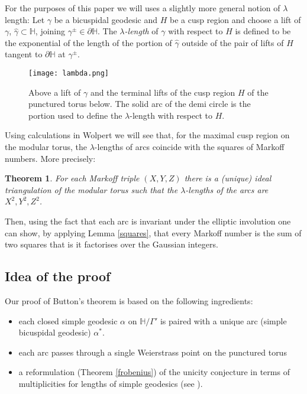\documentclass[12pt,a4paper]{amsart}
\newtheorem{thm}{Theorem}[section]
\def\HH{\mathbb{H}}
\def\xx{\HH/\Gamma'}
\begin{document}
For the purposes of this paper we will uses a slightly more general notion of
$\lambda$ length: Let $\gamma$ be a bicuspidal geodesic and $H$ be a cusp
region and choose a lift of  
$\gamma$, $\hat{\gamma}\subset \HH$,
joining $\gamma^\pm \in \partial \HH$.
The \textit{$\lambda$-length} of $\gamma$ with respect to $H$ is
defined to be the exponential of the length of the portion of $\hat{\gamma}$ 
outside of the pair of lifts of $H$ tangent to $\partial \HH$ at $\gamma^\pm$.

\begin{figure}[ht]
\begin{center}
\texttt{[image: lambda.png]}
\end{center}
\caption{Above a lift of $\gamma$ and the terminal lifts of the cusp region $H$ of the punctured torus below.
The solid arc of the demi circle is the portion used to define the $\lambda$-length  with respect to $H$.}
	\label{fig:lambda length}
\end{figure}

 Using calculations in Wolpert \cite{saw} we will see that, for the maximal
 cusp region on the modular torus,  the $\lambda$-lengths of arcs coincide with
 the squares of Markoff numbers. More precisely:
 
\begin{thm}\label{thm:triangulation lengths}
For each  Markoff triple $(X,Y,Z)$
there is a (unique) ideal triangulation of the modular torus
such that the $\lambda$-lengths of the arcs are 
$X^2,Y^2,Z^2$.
\end{thm}

 Then, using the fact that each arc is invariant under the elliptic involution
 one can show, by applying Lemma \ref{squares}, that every Markoff number is
 the sum of two squares that is it factorises over the Gaussian integers.

 \subsection{Idea of the proof}

Our proof of Button's theorem is based on the following ingredients: 
\begin{itemize}
\item each closed simple geodesic $\alpha$ on $\xx$ is paired with a unique arc (simple bicuspidal geodesic) $\alpha^*$. 
\item each arc passes through a single Weierstrass point on the punctured torus
\item a reformulation (Theorem \ref{frobenius}) of the unicity conjecture in terms of multiplicities for lengths of simple geodesics (see \cite{mcp}).
\end{itemize}
\end{document}
